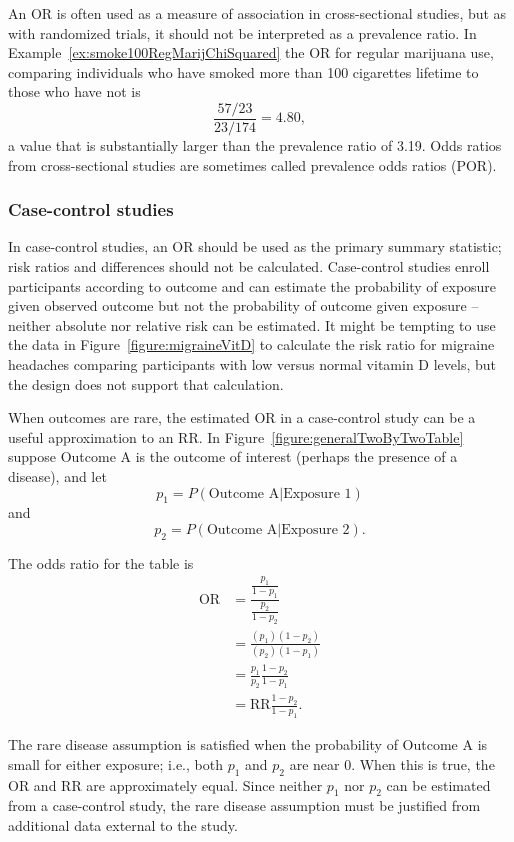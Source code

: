 An OR is often used as a measure of association in cross-sectional studies, but as with randomized trials, it should not be interpreted as a prevalence ratio.  In Example~\ref{ex:smoke100RegMarijChiSquared} the OR for regular marijuana use, comparing individuals who have smoked more than 100 cigarettes lifetime to those who have not is
\[
\frac{57/23}{23/174} = 4.80,
\]
a value that is substantially larger than the prevalence ratio of 3.19.  Odds ratios from cross-sectional studies are sometimes called prevalence odds ratios (POR).

\subsubsection{Case-control studies}

In case-control studies, an OR should be used as the primary summary statistic;  risk ratios and differences should not be calculated. Case-control studies enroll participants according to outcome and can estimate the probability of exposure given observed outcome but not the probability of outcome given exposure -- neither absolute nor relative risk can be estimated.  It might be tempting to use the data in Figure~\ref{figure:migraineVitD} to calculate the risk ratio for migraine headaches comparing participants with low versus normal vitamin D levels, but the design does not support that calculation.

When outcomes are rare, the estimated OR in a case-control study can be a useful approximation to an RR. In Figure~\ref{figure:generalTwoByTwoTable} suppose Outcome A is the outcome of interest (perhaps the presence of a disease), and let
\[
  p_1 = P(\text{Outcome A} | \text{Exposure 1})
\]
and
\[
  p_2 = P(\text{Outcome A} | \text{Exposure 2}).
\]

The odds ratio for the table is
\begin{align*}
  \text{OR} &= \dfrac{\frac{p_1}{1 - p_1}}{\frac{p_2}{1 - p_2}} \\
            &= \frac{(p_1)(1 - p_2)}{(p_2)(1 - p_1)} \\
            &= \frac{p_1}{p_2} \frac{1 - p_2}{1 - p_1} \\
            &= \text{RR} \frac{1 - p_2}{1 - p_1}.
\end{align*}

The rare disease assumption is satisfied when the probability of Outcome A is small for either exposure; i.e., both $p_1$ and $p_2$ are near 0. When this is true, the OR and RR are approximately equal. Since neither $p_1$ nor $p_2$ can be estimated from a case-control study, the rare disease assumption must be justified from additional data external to the study.

